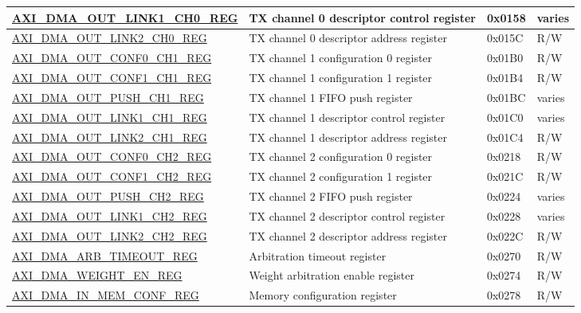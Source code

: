 \begin{longtable}{ | l | p{10cm} | p{1.3cm} | l | }
\hyperref[regdesc:AXIDMAOUTLINK1CHNREG]{AXI\_DMA\_OUT\_LINK1\_CH0\_REG} & TX channel 0 descriptor control register & 0x0158 & varies \\ \hline
\hyperref[regdesc:AXIDMAOUTLINK2CHNREG]{AXI\_DMA\_OUT\_LINK2\_CH0\_REG} & TX channel 0 descriptor address register & 0x015C & R/W \\ \hline
\hyperref[regdesc:AXIDMAOUTCONF0CHNREG]{AXI\_DMA\_OUT\_CONF0\_CH1\_REG} & TX channel 1 configuration 0 register & 0x01B0 & R/W \\ \hline
\hyperref[regdesc:AXIDMAOUTCONF1CHNREG]{AXI\_DMA\_OUT\_CONF1\_CH1\_REG} & TX channel 1 configuration 1 register & 0x01B4 & R/W \\ \hline
\hyperref[regdesc:AXIDMAOUTPUSHCHNREG]{AXI\_DMA\_OUT\_PUSH\_CH1\_REG} & TX channel 1 FIFO push register & 0x01BC & varies \\ \hline
\hyperref[regdesc:AXIDMAOUTLINK1CHNREG]{AXI\_DMA\_OUT\_LINK1\_CH1\_REG} & TX channel 1 descriptor control register & 0x01C0 & varies \\ \hline
\hyperref[regdesc:AXIDMAOUTLINK2CHNREG]{AXI\_DMA\_OUT\_LINK2\_CH1\_REG} & TX channel 1 descriptor address register & 0x01C4 & R/W \\ \hline
\hyperref[regdesc:AXIDMAOUTCONF0CHNREG]{AXI\_DMA\_OUT\_CONF0\_CH2\_REG} & TX channel 2 configuration 0 register & 0x0218 & R/W \\ \hline
\hyperref[regdesc:AXIDMAOUTCONF1CHNREG]{AXI\_DMA\_OUT\_CONF1\_CH2\_REG} & TX channel 2 configuration 1 register & 0x021C & R/W \\ \hline
\hyperref[regdesc:AXIDMAOUTPUSHCHNREG]{AXI\_DMA\_OUT\_PUSH\_CH2\_REG} & TX channel 2 FIFO push register & 0x0224 & varies \\ \hline
\hyperref[regdesc:AXIDMAOUTLINK1CHNREG]{AXI\_DMA\_OUT\_LINK1\_CH2\_REG} & TX channel 2 descriptor control register & 0x0228 & varies \\ \hline
\hyperref[regdesc:AXIDMAOUTLINK2CHNREG]{AXI\_DMA\_OUT\_LINK2\_CH2\_REG} & TX channel 2 descriptor address register & 0x022C & R/W \\ \hline
\hyperref[regdesc:AXIDMAARBTIMEOUTREG]{AXI\_DMA\_ARB\_TIMEOUT\_REG} & Arbitration timeout register & 0x0270 & R/W \\ \hline
\hyperref[regdesc:AXIDMAWEIGHTENREG]{AXI\_DMA\_WEIGHT\_EN\_REG} & Weight arbitration enable register & 0x0274 & R/W \\ \hline
\hyperref[regdesc:AXIDMAINMEMCONFREG]{AXI\_DMA\_IN\_MEM\_CONF\_REG} & Memory configuration register & 0x0278 & R/W \\ \hline

\end{longtable}
